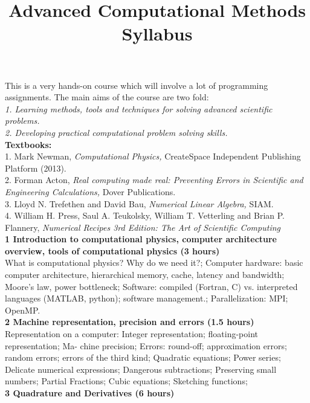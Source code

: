 \documentclass[12pt]{article}
\title{Advanced Computational Methods\\
Syllabus}
\begin{document}
\maketitle
This is a very hands-on course which will involve a lot of programming assignments. The
main aims of the course are two fold:\\
\textit{
1. Learning methods, tools and techniques for solving advanced scientific problems.\\
2. Developing practical computational problem solving skills.\\
}
\textbf{Textbooks:}\\

1. Mark Newman, \textit{Computational Physics,} CreateSpace Independent Publishing Platform
(2013).\\
2. Forman Acton, \textit{Real computing made real: Preventing Errors in Scientific and Engineering Calculations,} Dover Publications.\\
3. Lloyd N. Trefethen and David Bau, \textit{Numerical Linear Algebra,} SIAM.\\
4. William H. Press, Saul A. Teukolsky, William T. Vetterling and Brian P. Flannery,
\textit{Numerical Recipes 3rd Edition: The Art of Scientific Computing
}
\\
\textbf{1
Introduction to computational physics, computer architecture overview, tools
of computational physics (3 hours)}\\

What is computational physics? Why do we need it?; Computer hardware: basic computer
architecture, hierarchical memory, cache, latency and bandwidth; Moore’s law, power bottleneck; Software: compiled (Fortran, C) vs. interpreted languages (MATLAB, python);
software management.; Parallelization: MPI; OpenMP.\\

\textbf{2
Machine representation, precision and errors (1.5 hours)}\\

Representation on a computer: Integer representation; floating-point representation; Ma-
chine precision; Errors: round-off; approximation errors; random errors; errors of the third
kind; Quadratic equations; Power series; Delicate numerical expressions; Dangerous subtractions; Preserving small numbers; Partial Fractions; Cubic equations; Sketching functions;
\\
\textbf{3
Quadrature and Derivatives (6 hours)}\\
\end{document}

